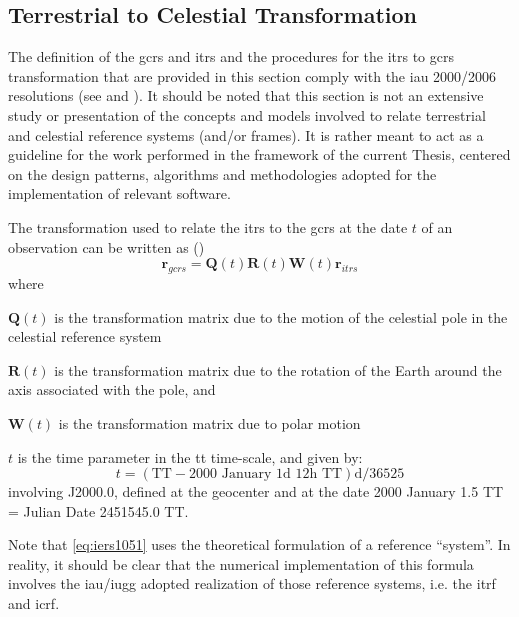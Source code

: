 \subsection{Terrestrial to Celestial Transformation}\label{ssec:itrs-to-gcrs}

The definition of the \gls{gcrs} and \gls{itrs} and the procedures for the \gls{itrs} 
to \gls{gcrs} transformation that are provided in this section comply with the 
\gls{iau} 2000/2006 resolutions (see \cite{Capitaine2006b} and \cite{iauWGnfa}). 
It should be noted that this section is not an extensive study or presentation 
of the concepts and models involved to relate terrestrial and celestial reference 
systems (and/or frames). It is rather meant to act as a guideline for the work 
performed in the framework of the current Thesis, centered on the design patterns, 
algorithms and methodologies adopted for the implementation of relevant software.

The transformation used to relate the \gls{itrs} to the \gls{gcrs} at the date $t$ 
of an observation can be written as (\cite{iers2010})
\begin{equation}\label{eq:iers1051}
    \bm{r}_{gcrs} = \bm{Q}(t) \bm{R}(t) \bm{W}(t) \bm{r}_{itrs}
\end{equation}
where
\begin{description}
    \item $\bm{Q}(t)$ is the transformation matrix due to the motion of 
        the celestial pole in the celestial reference system 
    \item $\bm{R}(t)$ is the transformation matrix due to the rotation 
        of the Earth around the axis associated with the pole, and
    \item $\bm{W}(t)$ is the transformation matrix due to polar motion
    \item $t$ is the time parameter in the \gls{tt} time-scale, and given by:
    \begin{equation}
        t = (\text{TT} - \text{2000 January 1d 12h TT}) \si{\day} / 36525
    \end{equation}
    involving J2000.0, defined at the geocenter and at the date 2000 January 1.5 TT 
    = Julian Date 2451545.0 TT.
\end{description}
Note that \autoref{eq:iers1051} uses the theoretical formulation of a reference ``system''. 
In reality, it should be clear that the numerical implementation of this formula 
involves the \gls{iau}/\gls{iugg} adopted realization of those reference systems, i.e. 
the \gls{itrf} and \gls{icrf}.

